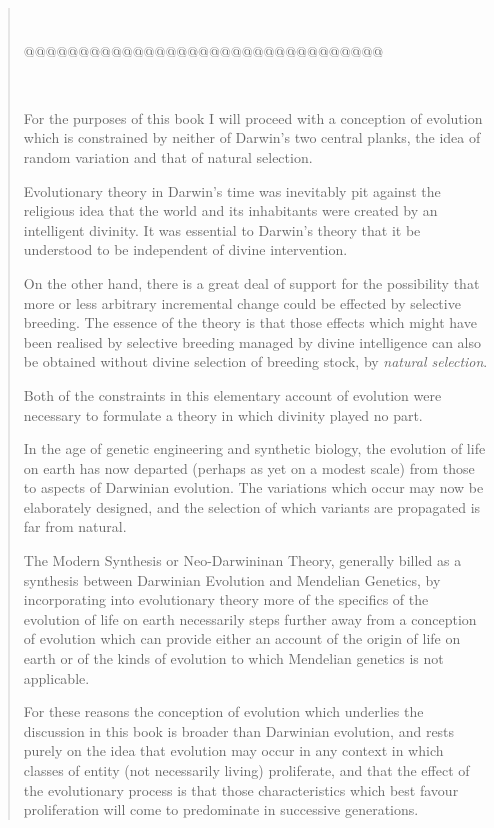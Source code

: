 {\begin{quote}
\ 

@@@@@@@@@@@@@@@@@@@@@@@@@@@@@@@@@

\


For the purposes of this book I will proceed with a conception of evolution which is constrained  by neither of Darwin's two central planks, the idea of random variation and that of natural selection.

Evolutionary theory in Darwin's time was inevitably pit against the religious idea that the world and its inhabitants were created by an intelligent divinity.
It was essential to Darwin's theory that it be understood to be independent of divine intervention.

On the other hand, there is a great deal of support for the possibility that more or less arbitrary incremental change could be effected by selective breeding.
The essence of the theory is that those effects which might have been realised by selective breeding managed by divine intelligence can also be obtained without divine selection of breeding stock, by \emph{natural selection}.

Both of the constraints in this elementary account of evolution were necessary to formulate a theory in which divinity played no part.

In the age of genetic engineering and synthetic biology, the evolution of life on earth has now departed (perhaps as yet on a modest scale) from those to aspects of Darwinian evolution.
The variations which occur may now be elaborately designed, and the selection of which variants are propagated is far from natural.

The Modern Synthesis or Neo-Darwininan Theory, generally billed as a synthesis between Darwinian Evolution and Mendelian Genetics, by incorporating into evolutionary theory more of the specifics of the evolution of life on earth necessarily steps further away from a conception of evolution which can provide either an account of the origin of life on earth or of the kinds of evolution to which Mendelian genetics is not applicable.

For these reasons the conception of evolution which underlies the discussion in this book is broader than Darwinian evolution, and rests purely on the idea that evolution may occur in any context in which classes of entity (not necessarily living) proliferate, and that the effect of the evolutionary process is that those characteristics which best favour proliferation will come to predominate in successive generations.


\end{quote}}
